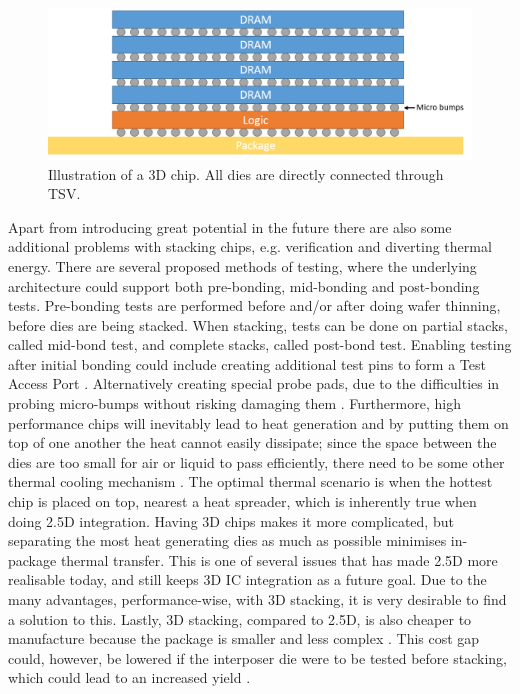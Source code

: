 \begin{figure}[!ht]
\centering
\includegraphics[width=0.75\linewidth]{figure/3D-integration.png}
\caption{Illustration of a 3D chip. All dies are directly connected through TSV.}
\label{3D-chip}
\end{figure}

Apart from introducing great potential in the future there are also some additional problems with stacking chips, e.g. verification and diverting thermal energy. There are several proposed methods of testing, where the underlying architecture could support both pre-bonding, mid-bonding and post-bonding tests. Pre-bonding tests are performed before and/or after doing wafer thinning, before dies are being stacked. When stacking, tests can be done on partial stacks, called mid-bond test, and complete stacks, called post-bond test. Enabling testing after initial bonding could include creating additional test pins to form a Test Access Port \cite{Marinissen:2012:CES:2492708.2493023}. Alternatively creating special probe pads, due to the difficulties in probing micro-bumps without risking damaging them \cite{5751450}. Furthermore, high performance chips will inevitably lead to heat generation and by putting them  on top of one another the heat cannot easily dissipate; since the space between the dies are too small for air or liquid to pass efficiently, there need to be some other thermal cooling mechanism \cite{5501261}. The optimal thermal scenario is when the hottest chip is placed on top, nearest a heat spreader, which is inherently true when doing 2.5D integration. Having 3D chips makes it more complicated, but separating the most heat generating dies as much as possible minimises in-package thermal transfer. This is one of several issues that has made 2.5D more realisable today, and still keeps 3D IC integration as a future goal. Due to the many advantages, performance-wise, with 3D stacking, it is very desirable to find a solution to this. Lastly, 3D stacking, compared to 2.5D, is also cheaper to manufacture because the package is smaller and less complex \cite{6263032}. This cost gap could, however, be lowered if the interposer die were to be tested before stacking, which could lead to an increased yield \cite{6542130}.


